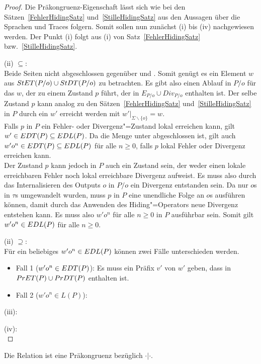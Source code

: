 \begin{proof}
  Die Präkongruenz-Eigenschaft lässt sich wie bei den
  Sätzen~\ref{FehlerHidingSatz} und~\ref{StilleHidingSatz} aus den Aussagen
  über die Sprachen und Traces folgern. Somit sollen nun zunächst (i) bis (iv)
  nachgewiesen werden. Der Punkt (i) folgt aus (i) von
  Satz~\ref{FehlerHidingSatz} bzw.~\ref{StilleHidingSatz}.

  (ii) \glqq $\subseteq$\grqq{}:\\
  Beide Seiten nicht abgeschlossen gegenüber \prune{} und \cont{}. Somit genügt
  es ein Element $w$ aus $StET (P/o)\cup StDT (P/o)$ zu betrachten. Es gibt
  also einen Ablauf in $P/o$ für das $w$, der zu einem Zustand $p$ führt, der
  in $E_{P/o}\cup Div_{P/o}$ enthalten ist. Der selbe Zustand $p$ kann analog
  zu den Sätzen~\ref{FehlerHidingSatz} und~\ref{StilleHidingSatz} in $P$ durch
  ein $w'$ erreicht werden mit $w'|_{\Sigma\backslash\{o\}} = w$.\\
  Falls $p$ in $P$ ein Fehler- oder Divergenz"=Zustand lokal erreichen kann,
  gilt $w'\in EDT (P)\subseteq EDL (P)$. Da die Menge \EDL{} unter \cont{}
  abgeschlossen ist, gilt auch $w'o^n\in EDT (P)\subseteq EDL (P)$ für alle
  $n\geq 0$, falls $p$ lokal Fehler oder Divergenz erreichen kann.\\
  Der Zustand $p$ kann jedoch in $P$ auch ein Zustand sein, der weder einen
  lokale erreichbaren Fehler noch lokal erreichbare Divergenz aufweist. Es muss
  also durch das Internalisieren des Outputs $o$ in $P/o$ ein Divergenz
  entstanden sein. Da nur $o$s in $\tau$s umgewandelt wurden, muss $p$ in $P$
  eine unendliche Folge an $o$s ausführen können, damit durch das Anwenden des
  Hiding"=Operators neue Divergenz entstehen kann. Es muss also $w'o^n$ für
  alle $n\geq 0$ in $P$ ausführbar sein. Somit gilt $w'o^n\in EDL (P)$ für alle
  $n\geq 0$.

  (ii)  \glqq $\supseteq$\grqq{}:\\
  Für ein beliebiges $w'o^n\in EDL (P)$ können zwei Fälle unterschieden
  werden.
  \begin{itemize}
    \item Fall 1 ($w'o^n\in EDT (P)$): Es muss ein Präfix $v'$ von $w'$ geben,
      dass in $PrET (P)\cup PrDT (P)$ enthalten ist. 
    \item Fall 2 ($w'o^n\in L (P)$): 
  \end{itemize}

  (iii):\\

  (iv):\\
\end{proof}


\begin{Kor}
  Die Relation \DRel{} ist eine Präkongruenz bezüglich $\cdot |\cdot$.
\end{Kor}
